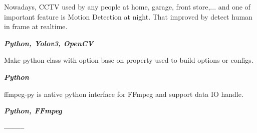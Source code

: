 \documentclass[10pt,a4paper,ragged2e,withhyper]{altacv}
\begin{document}
\medskip

\divider

\medskip

\begin{minipage}{\linewidth}
\justifying
Nowadays, CCTV used by any people at home, garage, front store,... and one of important feature is Motion Detection at night. That improved by detect human in frame at realtime.
\smallskip

\textit{\textbf{Python, Yolov3, OpenCV}}
\end{minipage}

\medskip

\divider

\medskip

\begin{minipage}{\linewidth}
\justifying
Make python class with option base on property used to build options or configs.
\smallskip

\textit{\textbf{Python}}
\end{minipage}

\medskip

\divider

\medskip

\begin{minipage}{\linewidth}
	\justifying
	ffmpeg-py is native python interface for FFmpeg and support data IO handle.
	\smallskip
	
	\textit{\textbf{Python, FFmpeg}}
\end{minipage}

\bigskip
\begin{minipage}{\linewidth}
	\centering
	\textbf{\color{accent}--------}
\end{minipage}
	
\end{document}
